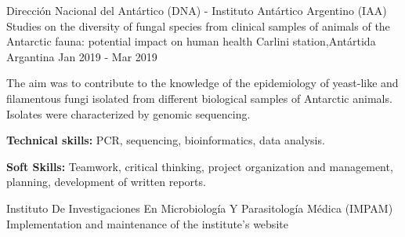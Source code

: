 \begin{cventries}
  \cventry
    {Dirección Nacional del Antártico (DNA) - Instituto Antártico Argentino (IAA)} %
    {Studies on the diversity of fungal species from clinical samples of animals of the Antarctic fauna: potential impact on human health} %
    {Carlini station,\newline Antártida Argantina} %
    {Jan 2019 - Mar 2019} %
    {
      \begin{cvitems} %
        \item {The aim was to contribute to the knowledge of the epidemiology of yeast-like and filamentous fungi isolated from different biological samples of Antarctic animals. Isolates were characterized by genomic sequencing.}
        \item {\textbf{Technical skills:} PCR, sequencing, bioinformatics, data analysis.}
        \item {\textbf{Soft Skills:} Teamwork, critical thinking, project organization and management, planning, development of written reports.}
      \end{cvitems}
    }
  \cventry
    {Instituto De Investigaciones En Microbiología Y Parasitología Médica (IMPAM)} %
    {Implementation and maintenance of the institute's website} %

\end{cventries}
